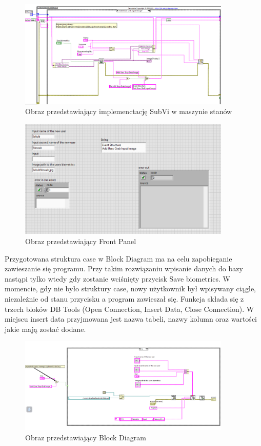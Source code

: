 \documentclass{report}
\begin{document}
\begin{figure}[H]
    \centering
    \includegraphics[width=0.9\textwidth]{src/Database/Database_write.png}
    \caption{Obraz przedstawiający implemenctację SubVi w maszynie stanów}
    \label{fig:first-att}
\end{figure}

\begin{figure}[H]
    \centering
    \includegraphics[width=0.9\textwidth]{src/Database/Database_write_subvi_frontpanel.png}
    \caption{Obraz przedstawiający Front Panel}
    \label{fig:first-att}
\end{figure}

Przygotowana struktura case w Block Diagram ma na celu zapobieganie zawieszanie się programu. Przy takim rozwiązaniu wpisanie danych do bazy
nastąpi tylko wtedy gdy zostanie wciśnięty przycisk Save biometrics. W momencie, gdy nie było struktury case, nowy użytkownik był wpisywany ciągle, niezależnie od stanu przycisku
a program zawieszał się.
Funkcja składa się z trzech bloków DB Tools (Open Connection, Insert Data, Close Connection). W miejscu insert data przyjmowana jest nazwa tabeli, nazwy kolumn oraz wartości jakie mają zostać dodane.

\begin{figure}[H]
    \centering
    \includegraphics[width=0.9\textwidth]{src/Database/Database_write_subvi.png}
    \caption{Obraz przedstawiający Block Diagram}
    \label{fig:first-att}
\end{figure}
\end{document}
